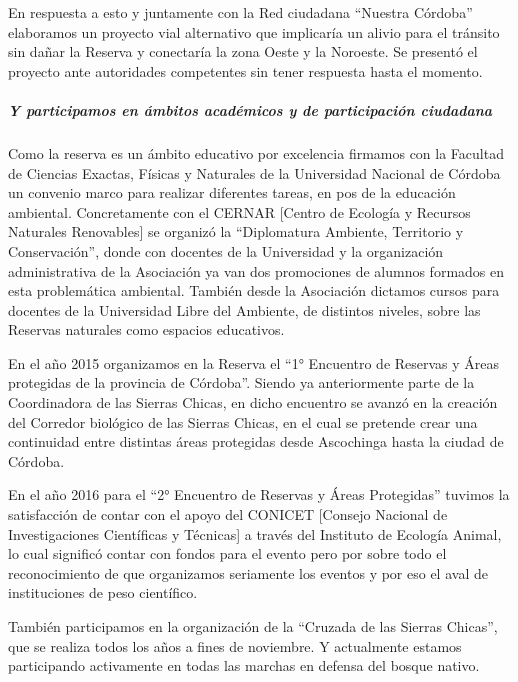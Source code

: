 \documentclass[
]{article}
\begin{document}
En respuesta a esto y juntamente con la Red ciudadana ``Nuestra
Córdoba'' elaboramos un proyecto vial alternativo que implicaría un
alivio para el tránsito sin dañar la Reserva y conectaría la zona Oeste
y la Noroeste. Se presentó el proyecto ante autoridades competentes sin
tener respuesta hasta el momento.

\hypertarget{y-participamos-en-uxe1mbitos-acaduxe9micos-y-de-participaciuxf3n-ciudadana}{%
\subparagraph{Y participamos en ámbitos académicos y de participación
ciudadana}\label{y-participamos-en-uxe1mbitos-acaduxe9micos-y-de-participaciuxf3n-ciudadana}}

Como la reserva es un ámbito educativo por excelencia firmamos con la
Facultad de Ciencias Exactas, Físicas y Naturales de la Universidad
Nacional de Córdoba un convenio marco para realizar diferentes tareas,
en pos de la educación ambiental. Concretamente con el CERNAR {[}Centro
de Ecología y Recursos Naturales Renovables{]} se organizó la
``Diplomatura Ambiente, Territorio y Conservación'', donde con docentes
de la Universidad y la organización administrativa de la Asociación ya
van dos promociones de alumnos formados en esta problemática ambiental.
También desde la Asociación dictamos cursos para docentes de la
Universidad Libre del Ambiente, de distintos niveles, sobre las Reservas
naturales como espacios educativos.

En el año 2015 organizamos en la Reserva el ``1° Encuentro de Reservas y
Áreas protegidas de la provincia de Córdoba''. Siendo ya anteriormente
parte de la Coordinadora de las Sierras Chicas, en dicho encuentro se
avanzó en la creación del Corredor biológico de las Sierras Chicas, en
el cual se pretende crear una continuidad entre distintas áreas
protegidas desde Ascochinga hasta la ciudad de Córdoba.

En el año 2016 para el ``2° Encuentro de Reservas y Áreas Protegidas''
tuvimos la satisfacción de contar con el apoyo del CONICET {[}Consejo
Nacional de Investigaciones Científicas y Técnicas{]} a través del
Instituto de Ecología Animal, lo cual significó contar con fondos para
el evento pero por sobre todo el reconocimiento de que organizamos
seriamente los eventos y por eso el aval de instituciones de peso
científico.

También participamos en la organización de la ``Cruzada de las Sierras
Chicas'', que se realiza todos los años a fines de noviembre. Y
actualmente estamos participando activamente en todas las marchas en
defensa del bosque nativo.
\end{document}

